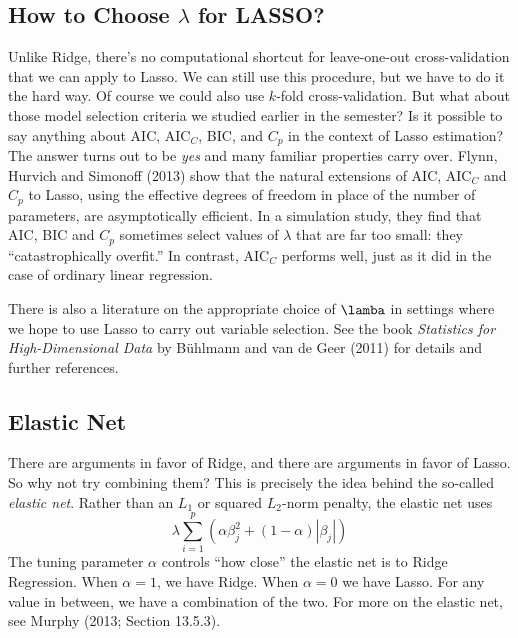 \documentclass[12pt]{article}
\theoremstyle{definition}
\begin{document}
\subsection{How to Choose $\lambda$ for LASSO?}
Unlike Ridge, there's no computational shortcut for leave-one-out cross-validation that we can apply to Lasso. We can still use this procedure, but we have to do it the hard way. Of course we could also use $k$-fold cross-validation. But what about those model selection criteria we studied earlier in the semester? Is it possible to say anything about AIC, AIC$_C$, BIC, and $C_p$ in the context of Lasso estimation? The answer turns out to be \emph{yes} and many familiar properties carry over. Flynn, Hurvich and Simonoff (2013) show that the natural extensions of AIC, AIC$_C$ and $C_p$ to Lasso, using the effective degrees of freedom in place of the number of parameters, are asymptotically efficient. In a simulation study, they find that AIC, BIC and $C_p$ sometimes select values of $\lambda$ that are far too small: they ``catastrophically overfit.'' In contrast, AIC$_C$ performs well, just as it did in the case of ordinary linear regression. 

There is also a literature on the appropriate choice of $\lamba$ in settings where we hope to use Lasso to carry out variable selection. See the book \emph{Statistics for High-Dimensional Data} by B\"{u}hlmann and van de Geer (2011) for details and further references.


\subsection{Elastic Net}
There are arguments in favor of Ridge, and there are arguments in favor of Lasso. So why not try combining them? This is precisely the idea behind the so-called \emph{elastic net}. Rather than an $L_1$ or squared $L_2$-norm penalty, the elastic net uses
	$$\lambda \sum_{i=1}^p \left(\alpha \beta_j^2 + (1-\alpha)|\beta_j| \right)$$
The tuning parameter $\alpha$ controls ``how close'' the elastic net is to Ridge Regression. When $\alpha = 1$, we have Ridge. When $\alpha = 0$ we have Lasso. For any value in between, we have a combination of the two. For more on the elastic net, see Murphy (2013; Section 13.5.3).


\end{document}
